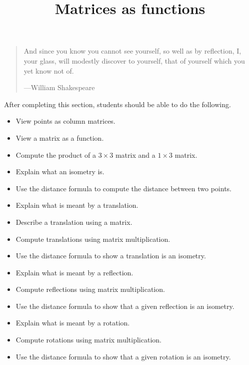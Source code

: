 \documentclass{ximera}
\title{Matrices as functions}
\begin{document}
\begin{abstract}
\end{abstract}
\maketitle

\begin{quote}
And since you know you cannot see yourself, so well as by reflection,
I, your glass, will modestly discover to yourself, that of yourself
which you yet know not of.

\hfill---William Shakespeare
\end{quote}
After completing this section, students should be able to do the following.

\begin{itemize}
\item View points as column matrices.
\item View a matrix as a function.
\item Compute the product of a $3\times 3$ matrix and a $1\times 3$ matrix.
\item Explain what an isometry is.
\item Use the distance formula to compute the distance between two points.
\item Explain what is meant by a translation.
\item Describe a translation using a matrix.
\item Compute translations using matrix multiplication.
\item Use the distance formula to show a translation is an isometry.
\item Explain what is meant by a reflection.
\item Compute reflections using matrix multiplication.
\item Use the distance formula to show that a given reflection is an isometry.
\item Explain what is meant by a rotation.
\item Compute rotations using matrix multiplication.
\item Use the distance formula to show that a given rotation is an isometry.
\end{itemize}
\end{document}
